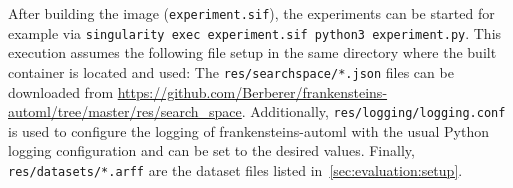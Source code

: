 After building the image (\texttt{experiment.sif}), the experiments can be started for example via \texttt{singularity exec experiment.sif python3 experiment.py}.\newline
This execution assumes the following file setup in the same directory where the built container is located and used:
The \texttt{res/searchspace/*.json} files can be downloaded from \url{https://github.com/Berberer/frankensteins-automl/tree/master/res/search_space}.
Additionally, \texttt{res/logging/logging.conf} is used to configure the logging of frankensteins-automl with the usual Python logging configuration and can be set to the desired values.
Finally, \texttt{res/datasets/*.arff} are the dataset files listed in~\ref{sec:evaluation:setup}.
